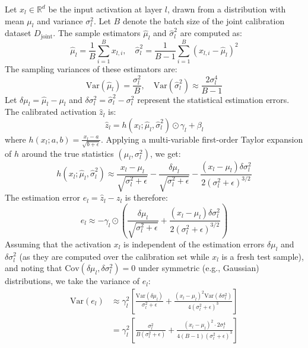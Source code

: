 \documentclass{article}
\theoremstyle{plain}
\theoremstyle{definition}
\begin{document}
Let $x_l \in \mathbb{R}^d$ be the input activation at layer $l$, drawn from a distribution with mean $\mu_l$ and variance $\sigma^2_l$. Let $B$ denote the batch size of the joint calibration dataset $D_{\text{joint}}$. The sample estimators $\hat{\mu}_l$ and $\hat{\sigma}^2_l$ are computed as:
\begin{equation}
    \hat{\mu}_l = \frac{1}{B} \sum_{i=1}^B x_{l, i}, \quad \hat{\sigma}^2_l = \frac{1}{B-1} \sum_{i=1}^B (x_{l, i} - \hat{\mu}_l)^2
\end{equation}
The sampling variances of these estimators are:
\begin{equation}
    \text{Var}(\hat{\mu}_l) = \frac{\sigma^2_l}{B}, \quad \text{Var}(\hat{\sigma}^2_l) \approx \frac{2\sigma^4_l}{B-1}
\end{equation}
Let $\delta \mu_l = \hat{\mu}_l - \mu_l$ and $\delta \sigma^2_l = \hat{\sigma}^2_l - \sigma^2_l$ represent the statistical estimation errors. The calibrated activation $\hat{z}_l$ is:
\begin{equation}
    \hat{z}_l = h(x_l; \hat{\mu}_l, \hat{\sigma}^2_l) \odot \gamma_l + \beta_l
\end{equation}
where $h(x_l; a, b) = \frac{x_l - a}{\sqrt{b + \epsilon}}$. Applying a multi-variable first-order Taylor expansion of $h$ around the true statistics $(\mu_l, \sigma^2_l)$, we get:
\begin{equation}
    h(x_l; \hat{\mu}_l, \hat{\sigma}^2_l) \approx \frac{x_l - \mu_l}{\sqrt{\sigma^2_l + \epsilon}} - \frac{\delta \mu_l}{\sqrt{\sigma^2_l + \epsilon}} - \frac{(x_l - \mu_l) \delta \sigma^2_l}{2(\sigma^2_l + \epsilon)^{3/2}}
\end{equation}
The estimation error $e_l = \hat{z}_l - z_l$ is therefore:
\begin{equation}
    e_l \approx -\gamma_l \odot \left( \frac{\delta \mu_l}{\sqrt{\sigma^2_l + \epsilon}} + \frac{(x_l - \mu_l) \delta \sigma^2_l}{2(\sigma^2_l + \epsilon)^{3/2}} \right)
\end{equation}
Assuming that the activation $x_l$ is independent of the estimation errors $\delta \mu_l$ and $\delta \sigma^2_l$ (as they are computed over the calibration set while $x_l$ is a fresh test sample), and noting that $\text{Cov}(\delta \mu_l, \delta \sigma^2_l) = 0$ under symmetric (e.g., Gaussian) distributions, we take the variance of $e_l$:
\begin{align}
    \text{Var}(e_l) &\approx \gamma_l^2 \left[ \frac{\text{Var}(\delta \mu_l)}{\sigma^2_l + \epsilon} + \frac{(x_l - \mu_l)^2 \text{Var}(\delta \sigma^2_l)}{4(\sigma^2_l + \epsilon)^3} \right] \\
    &= \gamma_l^2 \left[ \frac{\sigma^2_l}{B(\sigma^2_l + \epsilon)} + \frac{(x_l - \mu_l)^2 \cdot 2\sigma^4_l}{4(B-1)(\sigma^2_l + \epsilon)^3} \right]
\end{align}
\end{document}
